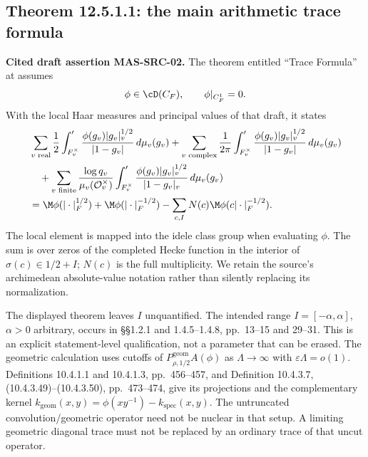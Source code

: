 \subsection{Theorem 12.5.1.1: the main arithmetic trace formula}
\textbf{Cited draft assertion MAS-SRC-02.} The theorem entitled ``Trace Formula'' at \cite[Theorem 12.5.1.1, pp.~519--520, (12.5.1.1)--(12.5.1.3)]{masullo} assumes
\[
 \phi\in\cD(C_F),\qquad \phi|_{C_F^1}=0.
\]
With the local Haar measures and principal values of that draft, it states
\begin{align}
 &\sum_{v\text{ real}}\frac12\int_{F_v^\times}'
       \frac{\phi(g_v)|g_v|_v^{1/2}}{|1-g_v|}\,d\mu_v(g_v)
 +\sum_{v\text{ complex}}\frac1{2\pi}\int_{F_v^\times}'
       \frac{\phi(g_v)|g_v|_v^{1/2}}{|1-g_v|}\,d\mu_v(g_v)\notag\\
 &\quad+\sum_{v\text{ finite}}\frac{\log q_v}{\mu_v(\mathcal O_v^\times)}
       \int_{F_v^\times}'\frac{\phi(g_v)|g_v|_v^{1/2}}{|1-g_v|_v}\,d\mu_v(g_v)\notag\\
 &=\M\phi(|\cdot|_F^{1/2})+\M\phi(|\cdot|_F^{-1/2})
   -\sum_{c,I}N(c)\M\phi(c|\cdot|_F^{-1/2}).\label{eq:masmain}
\end{align}
The local element is mapped into the idele class group when evaluating $\phi$. The sum is over zeros of the completed Hecke function in the interior of $\sigma(c)\in1/2+I$; $N(c)$ is the full multiplicity. We retain the source's archimedean absolute-value notation rather than silently replacing its normalization.

The displayed theorem leaves $I$ unquantified. The intended range $I=[-\alpha,\alpha]$, $\alpha>0$ arbitrary, occurs in \S\S1.2.1 and 1.4.5--1.4.8, pp.~13--15 and 29--31. This is an explicit statement-level qualification, not a parameter that can be erased. The geometric calculation uses cutoffs of $P^{\mathrm{geom}}_{\rho,1/2}A(\phi)$ as $\Lambda\to\infty$ with $\varepsilon\Lambda=o(1)$. Definitions 10.4.1.1 and 10.4.1.3, pp.~456--457, and Definition 10.4.3.7, (10.4.3.49)--(10.4.3.50), pp.~473--474, give its projections and the complementary kernel
$k_{\mathrm{geom}}(x,y)=\phi(xy^{-1})-k_{\mathrm{spec}}(x,y)$.
The untruncated convolution/geometric operator need not be nuclear in that setup. A limiting geometric diagonal trace must not be replaced by an ordinary trace of that uncut operator.

